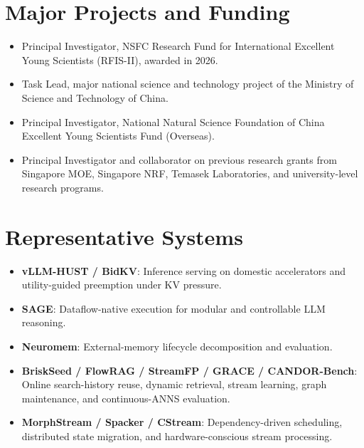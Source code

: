\documentclass[10pt,a4paper]{article}
\newcommand{\cvsection}[1]{\section*{#1}}
\begin{document}
\cvsection{Major Projects and Funding}
\begin{itemize}
  \item Principal Investigator, NSFC Research Fund for International Excellent Young Scientists (RFIS-II), awarded in 2026.
  \item Task Lead, major national science and technology project of the Ministry of Science and Technology of China.
  \item Principal Investigator, National Natural Science Foundation of China Excellent Young Scientists Fund (Overseas).
  \item Principal Investigator and collaborator on previous research grants from Singapore MOE, Singapore NRF, Temasek Laboratories, and university-level research programs.
\end{itemize}

\newpage
\cvsection{Representative Systems}
\begin{itemize}
  \item \textbf{vLLM-HUST / BidKV}: Inference serving on domestic accelerators and utility-guided preemption under KV pressure.
  \item \textbf{SAGE}: Dataflow-native execution for modular and controllable LLM reasoning.
  \item \textbf{Neuromem}: External-memory lifecycle decomposition and evaluation.
  \item \textbf{BriskSeed / FlowRAG / StreamFP / GRACE / CANDOR-Bench}: Online search-history reuse, dynamic retrieval, stream learning, graph maintenance, and continuous-ANNS evaluation.
  \item \textbf{MorphStream / Spacker / CStream}: Dependency-driven scheduling, distributed state migration, and hardware-conscious stream processing.
\end{itemize}
\end{document}
